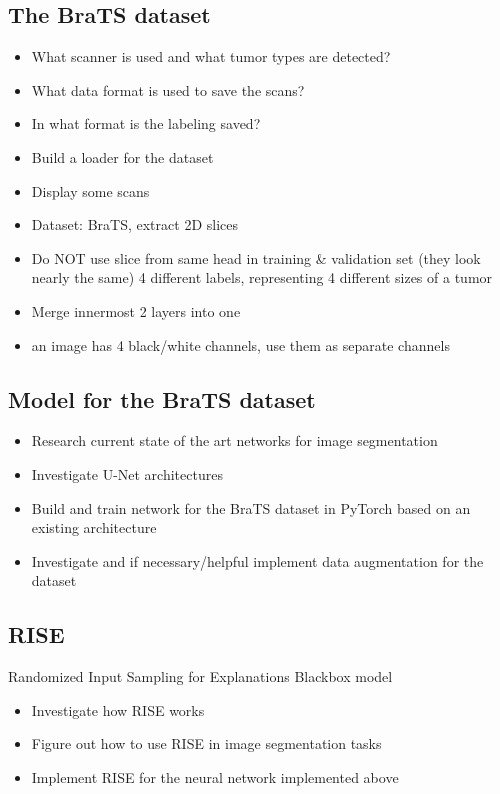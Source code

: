 \subsection{The BraTS dataset}
\begin{itemize}
    \item What scanner is used and what tumor types are detected?
    \item What data format is used to save the scans?
    \item In what format is the labeling saved?
    \item Build a loader for the dataset
    \item Display some scans
    \item Dataset: BraTS, extract 2D slices
    \item Do NOT use slice from same head in training \& validation set (they look nearly the same) 4 different labels, representing 4 different sizes of a tumor
    \item Merge innermost 2 layers into one
    \item an image has 4 black/white channels, use them as separate channels
\end{itemize}

\subsection{Model for the BraTS dataset}

\begin{itemize}
    \item Research current state of the art networks for image segmentation
    \item Investigate U-Net architectures
    \item Build and train network for the BraTS dataset in PyTorch based on an existing architecture
    \item Investigate and if necessary/helpful implement data augmentation for the dataset
\end{itemize}


\subsection{RISE}
Randomized Input Sampling for Explanations
Blackbox model
\begin{itemize}
    \item Investigate how RISE works
    \item Figure out how to use RISE in image segmentation tasks
    \item Implement RISE for the neural network implemented above
\end{itemize}

